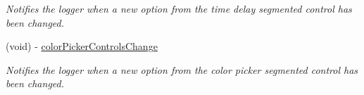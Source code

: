 \begin{DoxyCompactItemize}
\begin{DoxyCompactList}\small\item\em Notifies the logger when a new option from the time delay segmented control has been changed. \end{DoxyCompactList}\item 
\hypertarget{interface_causal_link_edit_menu_view_ab6f1c074117b868e4fb13c929b97643a}{(void) -\/ \hyperlink{interface_causal_link_edit_menu_view_ab6f1c074117b868e4fb13c929b97643a}{color\-Picker\-Controls\-Change}}\label{interface_causal_link_edit_menu_view_ab6f1c074117b868e4fb13c929b97643a}

\begin{DoxyCompactList}\small\item\em Notifies the logger when a new option from the color picker segmented control has been changed. \end{DoxyCompactList}\end{DoxyCompactItemize}
